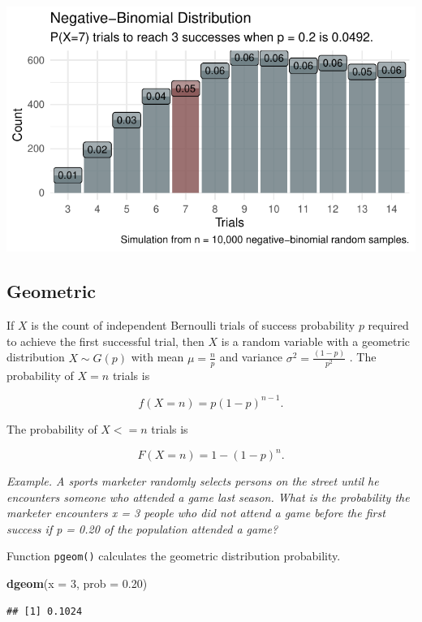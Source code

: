 \documentclass[]{book}
\newenvironment{Shaded}{\begin{snugshade}}{\end{snugshade}}
\newcommand{\DataTypeTok}[1]{\textcolor[rgb]{0.13,0.29,0.53}{#1}}
\newcommand{\DecValTok}[1]{\textcolor[rgb]{0.00,0.00,0.81}{#1}}
\newcommand{\FloatTok}[1]{\textcolor[rgb]{0.00,0.00,0.81}{#1}}
\newcommand{\KeywordTok}[1]{\textcolor[rgb]{0.13,0.29,0.53}{\textbf{#1}}}
\newcommand{\NormalTok}[1]{#1}
\begin{document}
\includegraphics{data-sci_files/figure-latex/unnamed-chunk-10-1.pdf}

\hypertarget{geometric}{%
\subsection{Geometric}\label{geometric}}

If \(X\) is the count of independent Bernoulli trials of success probability \(p\) required to achieve the first successful trial, then \(X\) is a random variable with a geometric distribution \(X \sim G(p)\) with mean \(\mu=\frac{{n}}{{p}}\) and variance \(\sigma^2 = \frac{{(1-p)}}{{p^2}}\) . The probability of \(X=n\) trials is

\[f(X=n) = p(1-p)^{n-1}.\]

The probability of \(X<=n\) trials is

\[F(X=n) = 1 - (1-p)^n.\]

\emph{Example. A sports marketer randomly selects persons on the street until he encounters someone who attended a game last season. What is the probability the marketer encounters x = 3 people who did not attend a game before the first success if p = 0.20 of the population attended a game?}

Function \texttt{pgeom()} calculates the geometric distribution probability.

\begin{Shaded}
\begin{Highlighting}[]
\KeywordTok{dgeom}\NormalTok{(}\DataTypeTok{x =} \DecValTok{3}\NormalTok{, }\DataTypeTok{prob =} \FloatTok{0.20}\NormalTok{)}
\end{Highlighting}
\end{Shaded}

\begin{verbatim}
## [1] 0.1024
\end{verbatim}
\end{document}
